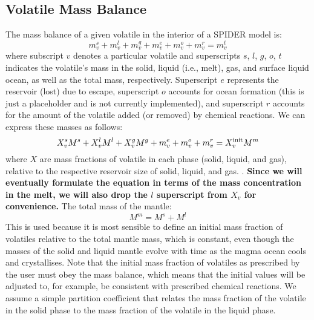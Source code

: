 
\noindent {}
\subsection{Volatile Mass Balance}
The mass balance of a given volatile in the interior of a SPIDER model \citep[e.g.,][]{LMC13} is:
\begin{equation}
m_v^s + m_v^l + m_v^g + m_v^e + m_v^o + m_v^r= m_v^t
\end{equation}
where subscript $v$ denotes a particular volatile and superscripts $s$, $l$, $g$, $o$, $t$ indicates the volatile's mass in the solid, liquid (i.e., melt), gas, and surface liquid ocean, as well as the total mass, respectively.  Superscript $e$ represents the reservoir (lost) due to escape, superscript $o$ accounts for ocean formation (this is just a placeholder and is not currently implemented), and superscript $r$ accounts for the amount of the volatile added (or removed) by chemical reactions.  We can express these masses as follows:
\begin{equation}
X_v^s M^s + X_v^l M^l + X_v^g M^g + m_v^e + m_v^o + m_v^r = X_v^{\rm init} M^m
\end{equation}
where $X$ are mass fractions of volatile in each phase (solid, liquid, and gas), relative to the respective  reservoir size of solid, liquid, and gas.  .  \textbf{Since we will eventually formulate the equation in terms of the mass concentration in the melt, we will also drop the $l$ superscript from $X_v$ for convenience.} The total mass of the mantle:
\begin{equation}
M^m = M^s + M^l
\end{equation}
This is used because it is most sensible to define an initial mass fraction of volatiles relative to the total mantle mass, which is constant, even though the masses of the solid and liquid mantle evolve with time as the magma ocean cools and crystallises.  Note that the initial mass fraction of volatiles as prescribed by the user must obey the mass balance, which means that the initial values will be adjusted to, for example, be consistent with prescribed chemical reactions.  We assume a simple partition coefficient that relates the mass fraction of the volatile in the solid phase to the mass fraction of the volatile in the liquid phase.
